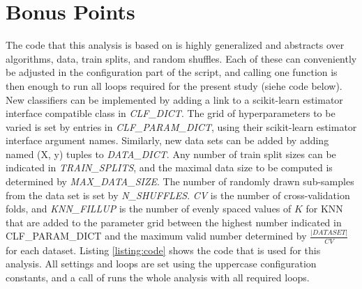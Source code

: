 \documentclass[twoside,11pt]{article}
\begin{document}
	\section{Bonus Points}
		The code that this analysis is based on is highly generalized and abstracts over algorithms, data, train splits, and random shuffles. Each of these can conveniently be adjusted in the configuration part of the script, and calling one function is then enough to run all loops required for the present study (siehe code below). New classifiers can be implemented by adding a link to a scikit-learn estimator interface compatible class in \textit{CLF\_DICT}. The grid of hyperparameters to be varied is set by entries in \textit{CLF\_PARAM\_DICT}, using their scikit-learn estimator interface argument names. Similarly, new data sets can be added by adding named (X, y) tuples to \textit{DATA\_DICT}. Any number of train split sizes can be indicated in \textit{TRAIN\_SPLITS}, and the maximal data size to be computed is determined by \textit{MAX\_DATA\_SIZE}. The number of randomly drawn sub-samples from the data set is set by \textit{N\_SHUFFLES}. \textit{CV} is the number of cross-validation folds, and \textit{KNN\_FILLUP} is the number of evenly spaced values of $K$ for KNN that are added to the parameter grid between the highest number indicated in CLF\_PARAM\_DICT and the maximum valid number determined by $\frac{|DATASET|}{CV}$ for each dataset. Listing \ref{listing:code} shows the code that is used for this analysis. All settings and loops are set using the uppercase configuration constants, and a call of  runs the whole analysis with all required loops.
		
\end{document}
